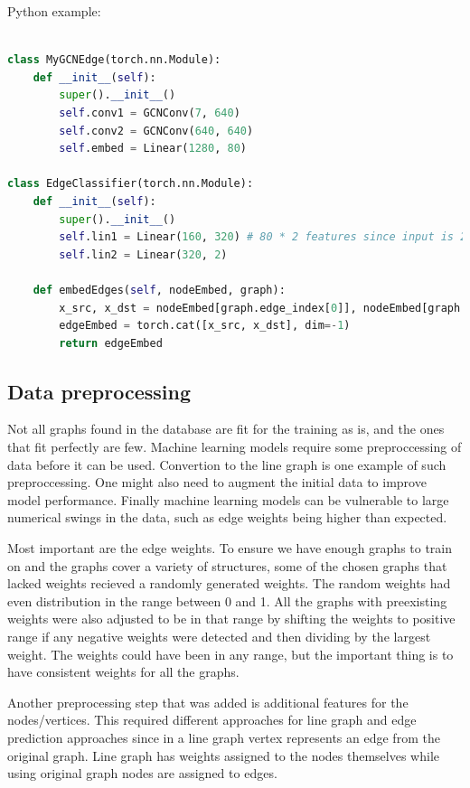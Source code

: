 Python example:

\begin{lstlisting}[language=Python]

class MyGCNEdge(torch.nn.Module):
    def __init__(self):
        super().__init__()
        self.conv1 = GCNConv(7, 640)
        self.conv2 = GCNConv(640, 640)
        self.embed = Linear(1280, 80)

class EdgeClassifier(torch.nn.Module):
    def __init__(self):
        super().__init__()
        self.lin1 = Linear(160, 320) # 80 * 2 features since input is 2 nodes.
        self.lin2 = Linear(320, 2)

    def embedEdges(self, nodeEmbed, graph):
        x_src, x_dst = nodeEmbed[graph.edge_index[0]], nodeEmbed[graph.edge_index[1]]
        edgeEmbed = torch.cat([x_src, x_dst], dim=-1)        
        return edgeEmbed

\end{lstlisting}

\subsection{Data preprocessing}
\label{sec:preprocessing}
Not all graphs found in the database are fit for the training as is, and the ones that fit perfectly are few. Machine learning models require some preproccessing of data before it can be used. Convertion to the line graph is one example of such preproccessing. One might also need to augment the initial data to improve model performance. Finally machine learning models can be vulnerable to large numerical swings in the data, such as edge weights being higher than expected.

Most important are the edge weights. To ensure we have enough graphs to train on and the graphs cover a variety of structures, some of the chosen graphs that lacked weights recieved a randomly generated weights. The random weights had even distribution in the range between 0 and 1. All the graphs with preexisting weights were also adjusted to be in that range by shifting the weights to positive range if any negative weights were detected and then dividing by the largest weight. The weights could have been in any range, but the important thing is to have consistent weights for all the graphs. 

Another preprocessing step that was added is additional features for the nodes/vertices. This required different approaches for line graph and edge prediction approaches since in a line graph vertex represents an edge from the original graph. Line graph has weights assigned to the nodes themselves while using original graph nodes are assigned to edges.

